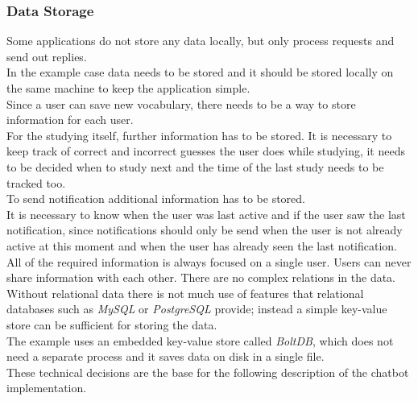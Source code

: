\subsubsection{Data Storage}

Some applications do not store any data locally, but only process requests and send out replies.
\\
In the example case data needs to be stored and it should be stored locally on the same machine
to keep the application simple.
\\

Since a user can save new vocabulary,
there needs to be a way to store information for each user.
\\
For the studying itself, further information has to be stored.
It is necessary to keep track of correct and incorrect guesses the user does while studying, it needs to be decided when to study next and the time of the last study needs to be tracked too.
\\

To send notification additional information has to be stored.
\\
It is necessary to know when the user was last active and if the user saw the last notification,
since notifications should only be send when the user is not already active at this moment
and when the user has already seen the last notification.
\\

All of the required information is always focused on a single user.
Users can never share information with each other.
There are no complex relations in the data.
\\
Without relational data there is not much use of features that relational databases such as \emph{MySQL} or \emph{PostgreSQL} provide;
instead a simple key-value store can be sufficient for storing the data.
\\
The example uses an embedded key-value store called \emph{BoltDB}\cite{boltdb}, which does not need a separate process and it saves data on disk in a single file.
\\


These technical decisions are the base for the following description of the chatbot implementation.
